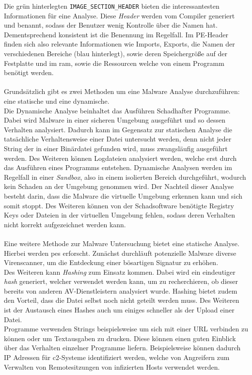 \documentclass[
    12pt, %
    DIV10,
    ngerman, %
    a4paper, %
    oneside, %
    titlepage, %
    parskip=half, %
    headings=normal, %
    listof=totoc, %
    bibliography=totoc, %
    index=totoc, %
    captions=tableheading, %
    final %
]{scrreprt}
\begin{document}
Die grün hinterlegten \texttt{IMAGE\_SECTION\_HEADER} bieten die interessantesten Informationen für eine Analyse. Diese \emph{Header} werden vom Compiler generiert und benannt, sodass der Benutzer wenig Kontrolle über die Namen hat. Dementsprechend konsistent ist die Benennung im Regelfall. Im PE-Header finden sich also relevante Informationen wie Imports, Exports, die Namen der verschiedenen Bereiche (blau hinterlegt), sowie deren Speichergröße auf der Festplatte und im \ac{ram}, sowie die Ressourcen welche von einem Programm benötigt werden.
\\\\
Grundsätzlich gibt es zwei Methoden um eine Malware Analyse durchzuführen: eine statische und eine dynamische.\\
Die Dynamische Analyse beinhaltet das Ausführen Schadhafter Programme. Dabei wird Malware in einer sicheren Umgebung ausgeführt und so dessen Verhalten analysiert. Dadurch kann im Gegensatz zur statischen Analyse die tatsächliche Verhaltensweise einer Datei untersucht werden, denn nicht jeder String der in einer Binärdatei gefunden wird, muss zwangsläufig ausgeführt werden. Des Weiteren können Logdateien analysiert werden, welche erst durch das Ausführen eines Programms entstehen.
Dynamische Analysen werden im Regelfall in einer \emph{Sandbox}, also in einem isolierten Bereich durchgeführt, wodurch kein Schaden an der Umgebung genommen wird.
Der Nachteil dieser Analyse besteht darin, dass die Malware die virtuelle Umgebung erkennen kann und sich somit stoppt. Des Weiteren können von der Schadsoftware benötigte Registry Keys oder Dateien in der virtuellen Umgebung fehlen, sodass deren Verhalten nicht korrekt aufgezeichnet werden kann.\\\\
Eine weitere Methode zur Malware Untersuchung bietet eine statische Analyse. Hierbei werden \ac{pes} erforscht. Zunächst durchläuft potenzielle Malware diverse Virenscanner, um die Entdeckung einer bösartigen Signatur zu erhöhen.\\ 
Des Weiteren kann \emph{Hashing} zum Einsatz kommen. Dabei wird ein eindeutiger \emph{hash} generiert, welcher verwendet werden kann, um zu recherchieren, ob dieser bereits von anderen AV-Dienstleistern analysiert wurde. Hashing bietet zudem den Vorteil, dass die Datei selbst noch nicht geteilt werden muss. Des Weiteren ist der Austausch eines Hashes auch um einiges schneller als der Upload einer Datei.\\
Programme verwenden Strings beispielsweise um sich mit einer URL verbinden zu können oder um Textausgaben zu drucken. Diese können einen guten Einblick über das Verhalten einzelner Programme liefern. Beispielsweise können dadurch IP Adressen für \ac{c2}-Systeme identifiziert werden, welche von Angreifern zum Verwalten von Remotesitzungen von infizierten Hosts verwendet werden.\\
\end{document}
